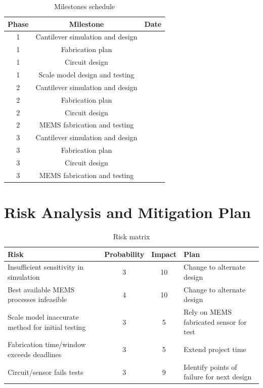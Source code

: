 \begin{table}[h!]
\centering
  \begin{tabular}{|c||c|c|}
    \hline
    Phase & Milestone & Date\\
    \hline
    \hline
    1 & Cantilever simulation and design & \\
    \hline
    1 & Fabrication plan & \\
    \hline
    1 & Circuit design & \\
    \hline
    1 & Scale model design and testing & \\
    \hline
    \hline
    2 & Cantilever simulation and design & \\
    \hline
    2 & Fabrication plan & \\
    \hline
    2 & Circuit design & \\
    \hline
    2 & MEMS fabrication and testing & \\
    \hline
    \hline
    3 & Cantilever simulation and design & \\
    \hline
    3 & Fabrication plan & \\
    \hline
    3 & Circuit design & \\
    \hline
    3 & MEMS fabrication and testing & \\
    \hline
  \end{tabular}
\caption{Milestones schedule}
\label{table:sched}
\end{table}

\section{Risk Analysis and Mitigation Plan}

\begin{table}[h!]
\centering
\begin{tabularx}{.85\textwidth}{|X||c|c|X|}
    \hline
    Risk & Probability & Impact & Plan\\
    \hline
    \hline
    Insufficient sensitivity in simulation & 3 & 10 & Change to alternate design \\
    \hline
    Best available MEMS processes infeasible & 4 & 10 & Change to alternate design \\
    \hline
    Scale model inaccurate method for initial testing & 3 & 5 & Rely on MEMS fabricated sensor for test \\
    \hline
    Fabrication time/window exceeds deadlines & 3 & 5 & Extend project time \\
    \hline
    Circuit/sensor fails tests & 3 & 9 & Identify points of failure for next design \\
    \hline
\end{tabularx}
\caption{Risk matrix}
\label{table:risk}
\end{table}

